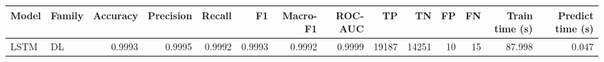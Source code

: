 \begin{tabular}{llrrrrrrrrrrrr}
\toprule
Model & Family & Accuracy & Precision & Recall & F1 & Macro-F1 & ROC-AUC & TP & TN & FP & FN & Train time (s) & Predict time (s) \\
\midrule
LSTM & DL & 0.9993 & 0.9995 & 0.9992 & 0.9993 & 0.9992 & 0.9999 & 19187 & 14251 & 10 & 15 & 87.998 & 0.047 \\
\bottomrule
\end{tabular}
